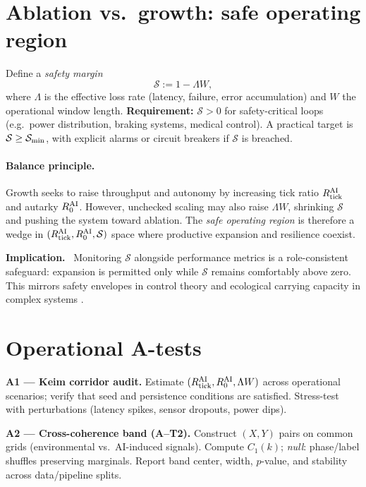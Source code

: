 \documentclass[12pt,a4paper,oneside]{scrreprt}
\newenvironment{implication}{\par\vspace{0.5em}\noindent\textbf{Implication.}\ }{\par\vspace{0.5em}}
\begin{document}
\section{Ablation vs.\ growth: safe operating region}\label{sec:ai-ablation}
Define a \emph{safety margin}
\begin{equation}
\mathcal S := 1 - \Lambda W ,
\end{equation}
where $\Lambda$ is the effective loss rate (latency, failure, error accumulation) and $W$ the operational window length.
\textbf{Requirement:} $\mathcal S>0$ for safety-critical loops (e.g.\ power distribution, braking systems, medical control). 
A practical target is $\mathcal S\ge \mathcal S_{\rm min}$, with explicit alarms or circuit breakers if $\mathcal S$ is breached.

\paragraph{Balance principle.}
Growth seeks to raise throughput and autonomy by increasing tick ratio $R_{\rm tick}^{\rm AI}$ and autarky $R_0^{\rm AI}$.
However, unchecked scaling may also raise $\Lambda W$, shrinking $\mathcal S$ and pushing the system toward ablation.
The \emph{safe operating region} is therefore a wedge in $(R_{\rm tick}^{\rm AI},R_0^{\rm AI},\mathcal S)$ space where productive expansion and resilience coexist.

\begin{implication}
Monitoring $\mathcal S$ alongside performance metrics is a role-consistent safeguard:
expansion is permitted only while $\mathcal S$ remains comfortably above zero.
This mirrors safety envelopes in control theory and ecological carrying capacity in complex systems \cite{holling1973resilience,leike2018scalable,hendrycks2023overview}.
\end{implication}

\section{Operational A-tests}\label{sec:ai-tests}
\textbf{A1 — Keim corridor audit.} 
Estimate $(R_{\rm tick}^{\rm AI}, R_0^{\rm AI}, \Lambda W)$ across operational scenarios; 
verify that seed and persistence conditions are satisfied. 
Stress-test with perturbations (latency spikes, sensor dropouts, power dips).

\textbf{A2 — Cross-coherence band (A–T2).} 
Construct $(X,Y)$ pairs on common grids (environmental vs.\ AI-induced signals). 
Compute $C_1(k)$; \emph{null}: phase/label shuffles preserving marginals. 
Report band center, width, $p$-value, and stability across data/pipeline splits.
\end{document}
